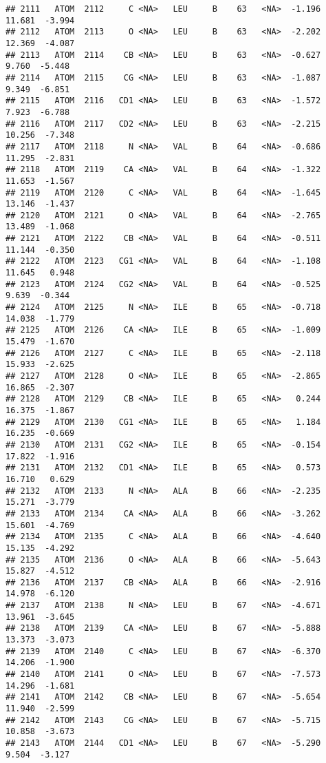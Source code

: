 \documentclass[
]{article}
\begin{document}
\begin{verbatim}
## 2111   ATOM  2112     C <NA>   LEU     B    63   <NA>  -1.196  11.681  -3.994
## 2112   ATOM  2113     O <NA>   LEU     B    63   <NA>  -2.202  12.369  -4.087
## 2113   ATOM  2114    CB <NA>   LEU     B    63   <NA>  -0.627   9.760  -5.448
## 2114   ATOM  2115    CG <NA>   LEU     B    63   <NA>  -1.087   9.349  -6.851
## 2115   ATOM  2116   CD1 <NA>   LEU     B    63   <NA>  -1.572   7.923  -6.788
## 2116   ATOM  2117   CD2 <NA>   LEU     B    63   <NA>  -2.215  10.256  -7.348
## 2117   ATOM  2118     N <NA>   VAL     B    64   <NA>  -0.686  11.295  -2.831
## 2118   ATOM  2119    CA <NA>   VAL     B    64   <NA>  -1.322  11.653  -1.567
## 2119   ATOM  2120     C <NA>   VAL     B    64   <NA>  -1.645  13.146  -1.437
## 2120   ATOM  2121     O <NA>   VAL     B    64   <NA>  -2.765  13.489  -1.068
## 2121   ATOM  2122    CB <NA>   VAL     B    64   <NA>  -0.511  11.144  -0.350
## 2122   ATOM  2123   CG1 <NA>   VAL     B    64   <NA>  -1.108  11.645   0.948
## 2123   ATOM  2124   CG2 <NA>   VAL     B    64   <NA>  -0.525   9.639  -0.344
## 2124   ATOM  2125     N <NA>   ILE     B    65   <NA>  -0.718  14.038  -1.779
## 2125   ATOM  2126    CA <NA>   ILE     B    65   <NA>  -1.009  15.479  -1.670
## 2126   ATOM  2127     C <NA>   ILE     B    65   <NA>  -2.118  15.933  -2.625
## 2127   ATOM  2128     O <NA>   ILE     B    65   <NA>  -2.865  16.865  -2.307
## 2128   ATOM  2129    CB <NA>   ILE     B    65   <NA>   0.244  16.375  -1.867
## 2129   ATOM  2130   CG1 <NA>   ILE     B    65   <NA>   1.184  16.235  -0.669
## 2130   ATOM  2131   CG2 <NA>   ILE     B    65   <NA>  -0.154  17.822  -1.916
## 2131   ATOM  2132   CD1 <NA>   ILE     B    65   <NA>   0.573  16.710   0.629
## 2132   ATOM  2133     N <NA>   ALA     B    66   <NA>  -2.235  15.271  -3.779
## 2133   ATOM  2134    CA <NA>   ALA     B    66   <NA>  -3.262  15.601  -4.769
## 2134   ATOM  2135     C <NA>   ALA     B    66   <NA>  -4.640  15.135  -4.292
## 2135   ATOM  2136     O <NA>   ALA     B    66   <NA>  -5.643  15.827  -4.512
## 2136   ATOM  2137    CB <NA>   ALA     B    66   <NA>  -2.916  14.978  -6.120
## 2137   ATOM  2138     N <NA>   LEU     B    67   <NA>  -4.671  13.961  -3.645
## 2138   ATOM  2139    CA <NA>   LEU     B    67   <NA>  -5.888  13.373  -3.073
## 2139   ATOM  2140     C <NA>   LEU     B    67   <NA>  -6.370  14.206  -1.900
## 2140   ATOM  2141     O <NA>   LEU     B    67   <NA>  -7.573  14.296  -1.681
## 2141   ATOM  2142    CB <NA>   LEU     B    67   <NA>  -5.654  11.940  -2.599
## 2142   ATOM  2143    CG <NA>   LEU     B    67   <NA>  -5.715  10.858  -3.673
## 2143   ATOM  2144   CD1 <NA>   LEU     B    67   <NA>  -5.290   9.504  -3.127

\end{verbatim}
\end{document}
